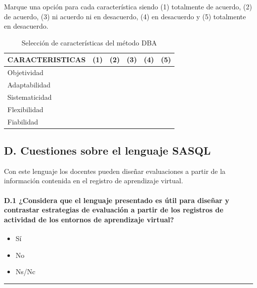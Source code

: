 Marque una opción para cada característica siendo (1) totalmente de acuerdo, (2) de acuerdo, (3) ni acuerdo ni en desacuerdo, (4) en desacuerdo y (5) totalmente en desacuerdo.

\begin{table}[H]
  \begin{center}
  \begin{tabular}{| m{5cm} | c | c | c | c | c |}
    \hline
    CARACTERISTICAS & (1) & (2) & (3) & (4) & (5) \\
    \hline
    \hline
    Objetividad &  &  & & & \\
    \hline
    Adaptabilidad &  &  & & & \\
    \hline
    Sistematicidad &  &  & & &  \\
    \hline
    Flexibilidad &  &  & & &  \\
    \hline
    Fiabilidad &  &  & & &  \\
    \hline
  \end{tabular}
\end{center}
\caption{Selección de características del método DBA}
\label{tab:ap:caracteristicas:metodo}
\end{table}

\newpage

\subsection*{D. Cuestiones sobre el lenguaje SASQL}

\begin{mdframed}[style=cuestionarioST]
	Con este lenguaje los docentes pueden diseñar evaluaciones a partir de la información contenida en el registro de aprendizaje virtual. 
\end{mdframed}

	\paragraph*{D.1 ¿Considera que el lenguaje presentado es útil para diseñar y contrastar estrategias de evaluación a partir de los registros de actividad de los entornos de aprendizaje virtual?}

\begin{mdframed}[style=cuestionarioST]
			\begin{itemize}
				\item Sí
				\item No
				\item Ns/Nc
			\end{itemize}

			\rule{30mm}{1pt} \newline
\end{mdframed}


